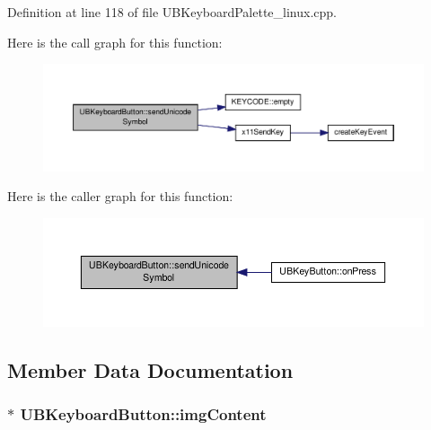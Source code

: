 Definition at line 118 of file U\-B\-Keyboard\-Palette\-\_\-linux.\-cpp.



Here is the call graph for this function\-:
\nopagebreak
\begin{figure}[H]
\begin{center}
\leavevmode
\includegraphics[width=350pt]{d2/d05/class_u_b_keyboard_button_a7b7c22df6975f5c884549f0b3b0319b7_cgraph}
\end{center}
\end{figure}




Here is the caller graph for this function\-:
\nopagebreak
\begin{figure}[H]
\begin{center}
\leavevmode
\includegraphics[width=350pt]{d2/d05/class_u_b_keyboard_button_a7b7c22df6975f5c884549f0b3b0319b7_icgraph}
\end{center}
\end{figure}




\subsection{Member Data Documentation}
\hypertarget{class_u_b_keyboard_button_a72d0a599d85f6cb818ff818fd101afbb}{
\subsubsection[{img\-Content}]{$\ast$ U\-B\-Keyboard\-Button\-::img\-Content\hspace{0.3cm}{\ttfamily [protected]}}}\label{d2/d05/class_u_b_keyboard_button_a72d0a599d85f6cb818ff818fd101afbb}



